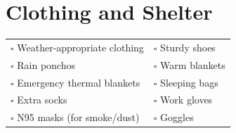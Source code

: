 
\section{Clothing and Shelter}
\label{sec:clothing}

\begin{tabular}{p{9cm} p{9cm}}
$\square$ Weather-appropriate clothing & $\square$ Sturdy shoes \\ 
$\square$ Rain ponchos & $\square$ Warm blankets \\ 
$\square$ Emergency thermal blankets & $\square$ Sleeping bags \\ 
$\square$ Extra socks & $\square$ Work gloves \\ 
$\square$ N95 masks (for smoke/dust) & $\square$ Goggles \\ 
\end{tabular}

